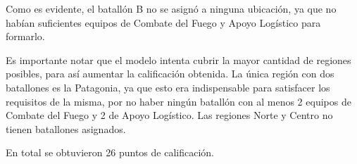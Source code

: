 \documentclass[12pt]{article}
\begin{document}
Como es evidente, el batallón B no se asignó a ninguna ubicación, ya que no habían suficientes equipos de Combate del Fuego y Apoyo Logístico para formarlo.

Es importante notar que el modelo intenta cubrir la mayor cantidad de regiones posibles, para así aumentar la calificación obtenida. La única región con dos batallones es la Patagonia, ya que esto era indispensable para satisfacer los requisitos de la misma, por no haber ningún batallón con al menos 2 equipos de Combate del Fuego y 2 de Apoyo Logístico. Las regiones Norte y Centro no tienen batallones asignados.

En total se obtuvieron 26 puntos de calificación.
\end{document}
